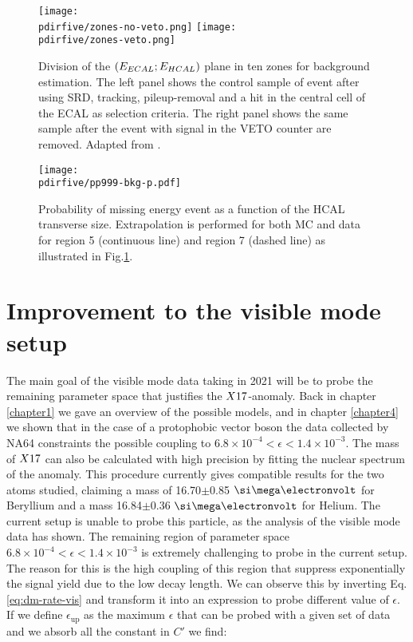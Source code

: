 \begin{figure}[tbh!]
  \centering
  \texttt{[image: \\pdirfive/zones-no-veto.png]}
  \texttt{[image: \\pdirfive/zones-veto.png]}
  \caption[Electronuclear background estimation]{Division of the $(E_{ECAL};E_{HCAL})$ plane in ten zones for background estimation. The left panel shows the control sample of event after using SRD, tracking, pileup-removal and a hit in the central cell of the ECAL as selection criteria. The right panel shows the same sample after the event with signal in the VETO counter are removed. Adapted from \cite{na64-neutrals-study}.}
  \label{fig:enucl-bkg-estimation}
\end{figure}

\begin{figure}[bth!]
  \centering
  \texttt{[image: \\pdirfive/pp999-bkg-p.pdf]}
  \caption[Background extrapolation invisible mode]{Probability of missing energy event as a function of the HCAL transverse size. Extrapolation is performed for both MC and data for region 5 (continuous line) and region 7 (dashed line) as illustrated in Fig.\ref{fig:enucl-bkg-estimation}.}
  \label{fig:enucl-bkg-extrapolation}
\end{figure}

\clearpage

\section{Improvement to the visible mode setup}
\label{ch5:sec:new-vismode-setup}

The main goal of the visible mode data taking in 2021 will be to probe the remaining parameter space that justifies the $X17$-anomaly. Back in chapter \ref{chapter1} we gave an overview of the possible models, and in chapter \ref{chapter4} we shown that in the case of a protophobic vector boson the data collected by NA64 constraints the possible coupling to $6.8 \times 10^{-4} < \epsilon < 1.4 \times 10^{-3}$. The mass of $X17$ can also be calculated with high precision by fitting the nuclear spectrum of the anomaly. This procedure currently gives compatible results for the two atoms studied, claiming a mass of 16.70$\pm$0.85 $\mev$ for Beryllium and a mass 16.84$\pm$0.36 $\mev$ for Helium. The current setup is unable to probe this particle, as the analysis of the visible mode data has shown. The remaining region of parameter space $6.8 \times 10^{-4} < \epsilon < 1.4 \times 10^{-3}$ is extremely challenging to probe in the current setup. The reason for this is the high coupling of this region that suppress exponentially the signal yield due to the low decay length. We can observe this by inverting Eq.\ref{eq:dm-rate-vis} and transform it into an expression to probe different value of $\epsilon$. If we define $\epsilon_{\textrm{up}}$ as the maximum $\epsilon$ that can be probed with a given set of data and we absorb all the constant in $C'$ we find:

